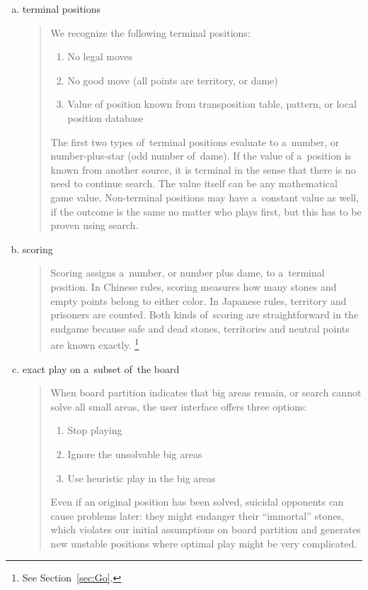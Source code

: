 \begin{enumerate}[(a)]
  \item terminal positions
    \begin{quotation} \noindent
      \noindent
      We recognize the following terminal positions:
      \begin{enumerate}[$\diamondsuit$]
        \item No legal moves
        \item No good move (all points are territory, or dame)
        \item Value of position known from transposition table, pattern, or local position database
      \end{enumerate}
      The first two types of~terminal positions evaluate to a~number, or number-plus-star (odd
      number of~dame).
      If the value of a~position is known from another source, it is terminal in the sense that there is no need to continue search.
      The value itself can be any mathematical game value.
      Non-terminal positions may have a~constant value as well, if the outcome is the same no matter who plays first, but this has to be proven using search.
    \end{quotation}

  \item scoring
    \begin{quotation} \noindent
      Scoring assigns a~number, or number plus dame, to a~terminal position.
      In Chinese rules, scoring measures how many stones and empty points belong to either color.
      In Japanese rules, territory and prisoners are counted.
      Both kinds of~scoring are straightforward in the endgame because safe and dead stones, territories and neutral points are known exactly.%
      \footnote{See Section~\ref{sec:Go}.}
    \end{quotation}

  \item exact play on a~subset of~the board
    \begin{quotation} \noindent
      When board partition indicates that big areas remain, or search cannot solve all small areas, the user interface offers three options:
      \begin{enumerate}[$\diamondsuit$]
        \item Stop playing
        \item Ignore the unsolvable big areas
        \item Use heuristic play in the big areas
      \end{enumerate}
      Even if an original position has been solved, suicidal opponents can cause problems later:
      they might endanger their ``immortal'' stones, which violates our initial assumptions on board partition and generates new unstable positions where optimal play might be very complicated.
    \end{quotation}


\end{enumerate}
